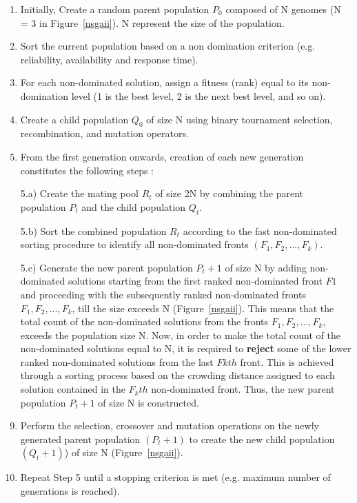 \documentclass[conference]{IEEEtran}
\begin{document}
\begin{enumerate}
\item Initially, Create a random parent population $P_{0}$ composed of N genomes (N = 3 in Figure~\ref{nsgaii}). N represent the size of the population.
\item Sort the current population based on a non domination criterion (e.g. reliability, availability and response time).
\item For each non-dominated solution, assign a fitness (rank) equal to its non-domination level (1 is the best level, 2 is the next best level, and so on).
\item Create a child population $Q_{0}$ of size N using binary tournament selection, recombination, and mutation operators.
\item From the first generation onwards, creation of each new generation constitutes the following steps :
\item[5.a)] Create the mating pool $R_{t}$ of size 2N by combining the parent population $P_{t}$ and the child population $Q_{t}$.
\item[5.b)] Sort the combined population $R_{t}$ according to the fast non-dominated sorting procedure to identify all non-dominated fronts $(F_{1} ,F_{2},...,F_{k})$.
\item[5.c)] Generate the new parent population $P_{t}+1$ of size N by adding non-dominated solutions starting from the first ranked non-dominated front $F1$ and proceeding with the subsequently ranked non-dominated fronts $F_{1} ,F_{2}, . . . ,F_{k}$, till the size exceeds N (Figure~\ref{nsgaii}). This means that the total count of the non-dominated solutions from the fronts $F_{1} ,F_{2}, . . . ,F_{k}$, exceeds the population size N. Now, in order to make the total count of the non-dominated solutions equal to N, it is required to \textbf{reject} some of the lower ranked non-dominated solutions from the last $Fkth$ front. This is achieved through a sorting process based on the crowding distance assigned to each solution contained in the $F_{k}th$ non-dominated front. Thus, the new parent population $P_{t}+1$ of size N is constructed.
\item Perform the selection, crossover and mutation operations on the newly generated parent population $(P_{t}+1)$ to create the new child population $(Q_{t}+1)$) of size N (Figure~\ref{nsgaii}).
\item Repeat Step 5 until a stopping criterion is met (e.g. maximum number of generations is reached).

\end{enumerate}
\end{document}
